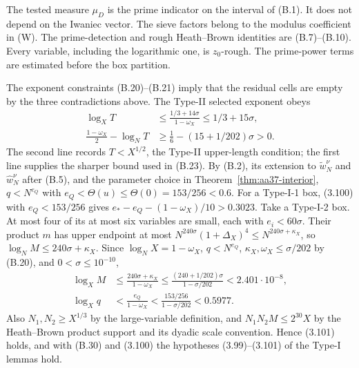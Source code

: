 The tested measure $\mu_D$ is the prime indicator on the interval
of (B.1). It does not depend on the Iwaniec vector. The sieve factors
belong to the modulus coefficient in (W). The prime-detection and
rough Heath--Brown identities are (B.7)--(B.10). Every
variable, including the logarithmic one, is $z_0$-rough. The
prime-power terms are estimated before the box partition.

The exponent constraints (B.20)--(B.21) imply that the residual cells
are empty by the three contradictions above. The Type-II selected exponent
obeys
\[
 \begin{aligned}
 \log_XT&\le\frac{1/3+14\sigma}{1-\omega_X}
 \le1/3+15\sigma,\\
 \frac{1-\omega_X}{2}-\log_NT
 &\ge\frac16-(15+1/202)\sigma>0.
 \end{aligned}
 \tag{B.30}
\]
The second line records $T<X^{1/2}$, the Type-II upper-length condition;
the first line supplies the sharper bound used in (B.23).
By (B.2), its extension to $\widetilde w_N^\nu$ and $\widehat w_N^\nu$
after (B.5), and the parameter choice in Theorem~\ref{thm:aa37-interior},
$q<N^{e_Q}$ with $e_Q<\Theta(u)\le\Theta(0)=153/256<0.6$.
For a Type-I-1 box, (3.100) with $e_Q<153/256$ gives
$e_*-e_Q-(1-\omega_X)/10>0.3023$.
Take a Type-I-2 box. At most four of its at most six variables are
small, each with $e_i<60\sigma$. Their product $m$ has upper endpoint at
most $N^{240\sigma}(1+\Delta_X)^4\le N^{240\sigma+\kappa_X}$, so
$\log_NM\le240\sigma+\kappa_X$. Since $\log_NX=1-\omega_X$, $q<N^{e_Q}$,
$\kappa_X,\omega_X\le\sigma/202$ by (B.20), and
$0<\sigma\le10^{-10}$,
\[
 \begin{aligned}
 \log_XM&\le\frac{240\sigma+\kappa_X}{1-\omega_X}
 \le\frac{(240+1/202)\sigma}{1-\sigma/202}
 <2.401\cdot10^{-8},\\
 \log_Xq&<\frac{e_Q}{1-\omega_X}
 <\frac{153/256}{1-\sigma/202}<0.5977.
 \end{aligned}
\]
Also $N_1,N_2\ge X^{1/3}$ by the
large-variable definition, and $N_1N_2M\le2^{30}X$ by the
Heath--Brown product support and its dyadic scale convention.
Hence (3.101) holds, and with (B.30) and (3.100) the hypotheses
(3.99)--(3.101) of the Type-I lemmas hold.

